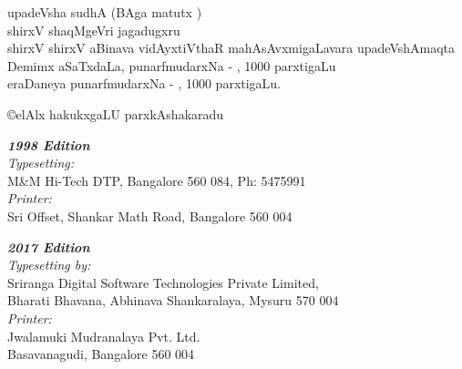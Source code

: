 \thispagestyle{empty}
\begin{center}
upadeVsha sudhA (BAga {} matutx {})\\
shirxV shaqMgeVri jagadugxru\\
shirxV shirxV aBinava vidAyxtiVthaR mahAsAvxmigaLavara upadeVshAmaqta\\
Demimx aSaTxdaLa, punarfmudarxNa - {, 1000} parxtigaLu\\ 
eraDaneya punarfmudarxNa - {, 1000} parxtigaLu. 
\end{center}
\vfill

\noindent
{\eng\copyright}elAlx hakukxgaLU parxkAshakaradu
\vfill


\noindent
\bgroup
{\sl\eng\bfseries 1998 Edition}\\
{\sl\eng Typesetting:}\\
{\eng M\&M Hi-Tech DTP, Bangalore 560 084, Ph: 5475991}\\
{\sl\eng Printer:}\\
{\eng Sri Offset, Shankar Math Road, Bangalore 560 004}
\bigskip

\noindent
{\sl\eng\bfseries 2017 Edition}\\
{\sl\eng Typesetting by:}\\
{\eng Sriranga Digital Software Technologies Private Limited,\\ 
Bharati Bhavana, Abhinava Shankaralaya, Mysuru 570 004}\\
{\sl\eng Printer:}\\
{\eng Jwalamuki Mudranalaya Pvt. Ltd.\\
Basavanagudi, Bangalore 560 004}
